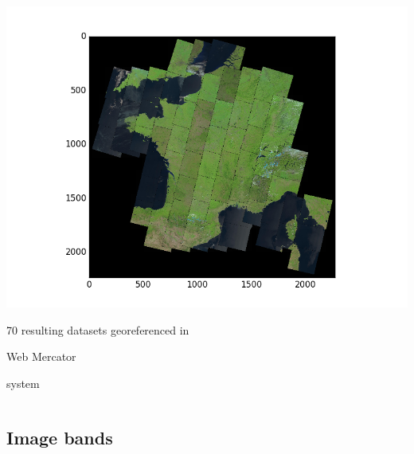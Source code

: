 \documentclass[c]{beamer}
\begin{document}
\begin{frame}
\begin{columns}[t]
\begin{column}{0.50\textwidth}
\begin{overlayarea}{\linewidth}{4cm}
  \centering\vfill
  \includegraphics[scale=0.25]{../../data/France/covering-selection.png}
\end{overlayarea}
\begin{overlayarea}{\linewidth}{1cm}
  \centering
  \scriptsize 70 resulting datasets georeferenced in \begin{itshape}Web Mercator\end{itshape} system\par
\end{overlayarea}
\end{column}
\end{columns}

\end{frame}

\subsection{Image bands}
\begin{frame}
\tableofcontents[currentsubsection]
\end{frame}
\end{document}
